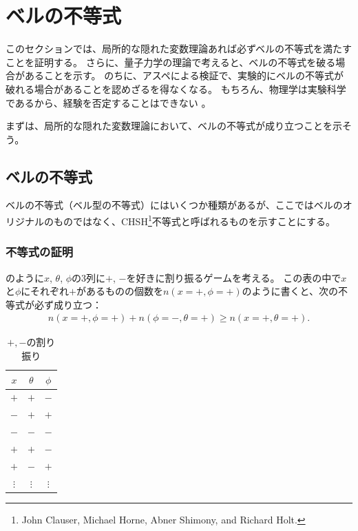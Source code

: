 \documentclass[10pt,b5paper,papersize,dvipdfmx]{jsbook}
\begin{document}
\fi
\ifsecII
\section{ベルの不等式}

このセクションでは、局所的な隠れた変数理論あれば必ずベルの不等式を満たすことを証明する。
さらに、量子力学の理論で考えると、ベルの不等式を破る場合があることを示す。
のちに、アスペによる検証で、実験的にベルの不等式が破れる場合があることを認めざるを得なくなる。
もちろん、物理学は実験科学であるから、経験を否定することはできない
。\par
まずは、局所的な隠れた変数理論において、ベルの不等式が成り立つことを示そう。

%
\subsection{ベルの不等式} %

ベルの不等式（ベル型の不等式）にはいくつか種類があるが、ここではベルのオリジナルのものではなく、CHSH\footnote{
  John Clauser, Michael Horne, Abner Shimony, and Richard Holt. %
}不等式と呼ばれるものを示すことにする。


%
\subsubsection{不等式の証明}
のように$x$, $\theta$, $\phi$の3列に$+$, $-$を好きに割り振るゲームを考える。
この表の中で$x$と$\phi$にそれぞれ$+$があるものの個数を$n(x=+,\phi=+)$のように書くと、次の不等式が必ず成り立つ：
\begin{align}
  n(x=+,\phi=+) + n(\phi=-,\theta=+) \ge n(x=+,\theta=+).
  \label{eq:bell's ineq}
\end{align}

\begin{table}[htbp]
  \centering
  \caption{$+, -$の割り振り}
  \label{tab:pm}
  \begin{tabular}{ccc} \hline
    $x$ & $\theta$ & $\phi$ \\ \hline
    $+$ & $+$ & $-$ \\
    $-$ & $+$ & $+$ \\
    $-$ & $-$ & $-$ \\
    $+$ & $+$ & $-$ \\
    $+$ & $-$ & $+$ \\
    $\vdots$ & $\vdots$ & $\vdots$ \\ \hline
  \end{tabular}
\end{table}
\end{document}
